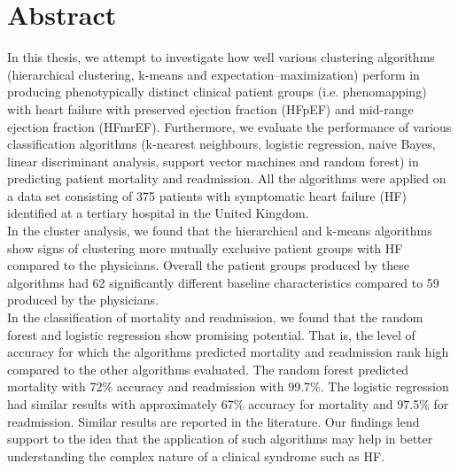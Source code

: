 \documentclass[../thesis.tex]{subfiles}
\begin{document}
\chapter*{Abstract}

\noindent In this thesis, we attempt to investigate how well various clustering algorithms (hierarchical clustering, k-means and expectation–maximization) perform in producing phenotypically distinct clinical patient groups (i.e. phenomapping) with heart failure with preserved ejection fraction (HFpEF) and mid-range ejection fraction (HFmrEF). Furthermore, we evaluate the performance of various classification algorithms (k-nearest neighbours, logistic regression, naive Bayes, linear discriminant analysis, support vector machines and random forest) in predicting patient mortality and readmission. All the algorithms were applied on a data set consisting of 375 patients with symptomatic heart failure (HF) identified at a tertiary hospital in the United Kingdom.\\
\indent In the cluster analysis, we found that the hierarchical and k-means algorithms show signs of clustering more mutually exclusive patient groups with HF compared to the physicians. Overall the patient groups produced by these algorithms had 62 significantly different baseline characteristics compared to 59 produced by the physicians. \\
\indent In the classification of mortality and readmission, we found that the random forest and logistic regression show promising potential. That is, the level of accuracy for which the algorithms predicted mortality and readmission rank high compared to the other algorithms evaluated. The random forest predicted mortality with 72\% accuracy and readmission with 99.7\%. The logistic regression had similar results with approximately 67\% accuracy for mortality and 97.5\% for readmission. Similar results are reported in the literature. Our findings lend support to the idea that the application of such algorithms may help in better understanding the complex nature of a clinical syndrome such as HF.
\end{document}
